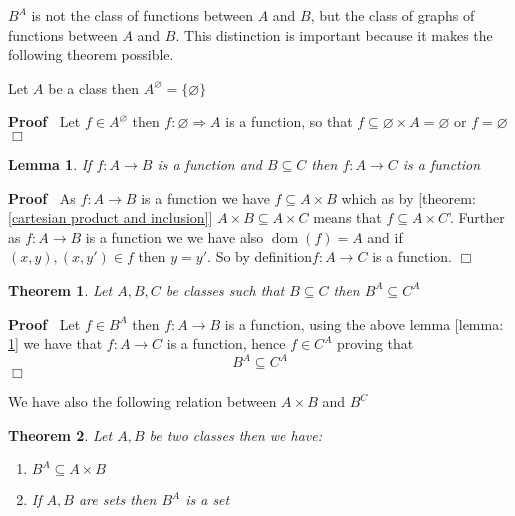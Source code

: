 \documentclass{book}
\newcommand{\tmop}[1]{\ensuremath{\operatorname{#1}}}
\newenvironment{proof}{\noindent\textbf{Proof\ }}{\hspace*{\fill}$\Box$\medskip}
\newtheorem{lemma}{Lemma}
\newtheorem{theorem}{Theorem}
\begin{document}
\begin{note}
  $B^A$ is not the class of functions between $A$ and $B$, but the class of
  graphs of functions between $A$ and $B$. This distinction is important
  because it makes the following theorem possible.
\end{note}

\begin{example}
  \label{function A^empty is empty}Let $A$ be a class then $A^{\varnothing} =
  \{ \varnothing \}$
\end{example}

\begin{proof}
  Let $f \in A^{\varnothing}$ then $f : \varnothing \Rightarrow A$ is a
  function, so that $f \subseteq \varnothing \times A = \varnothing$ or $f =
  \varnothing$
\end{proof}

\begin{lemma}
  \label{function extend target}If $f : A \rightarrow B$ is a function and $B
  \subseteq C$ then $f : A \rightarrow C$ is a function
\end{lemma}

\begin{proof}
  As $f : A \rightarrow B$ is a function we have $f \subseteq A \times B$
  which as by [theorem: \ref{cartesian product and inclusion}] $A \times B
  \subseteq A \times C$ means that $f \subseteq A \times C$'. Further as $f :
  A \rightarrow B$ is a function we we have also $\tmop{dom} (f) = A$ and if
  $(x, y), (x, y') \in f$ then $y = y'$. So by definition$f : A \rightarrow C$
  is a function.
\end{proof}

\begin{theorem}
  \label{function B^A and inclusion}Let $A, B, C$ be classes such that $B
  \subseteq C$ then $B^A \subseteq C^A$
\end{theorem}

\begin{proof}
  Let $f \in B^A$ then $f : A \rightarrow B$ is a function, using the above
  lemma [lemma: \ref{function extend target}] we have that $f : A \rightarrow
  C$ is a function, hence $f \in C^A$ proving that
  \[ B^A \subseteq C^A \]
\end{proof}

We have also the following relation between $A \times B$ and $B^C$

\begin{theorem}
  \label{function: A^B and sets}Let $A, B$ be two classes then we have:
  \begin{enumerate}
    \item $B^A \subseteq A \times B$
    
    \item If $A, B$ are sets then $B^A$ is a set
  \end{enumerate}
\end{theorem}
\end{document}
